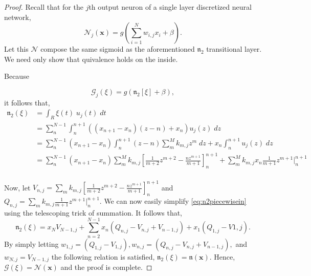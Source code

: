 \begin{proof}
	Recall that for the $j$th output neuron of a single layer discretized neural network,
	\begin{equation}
		\mathcal{N}_j(\pmb{x}) = g\left(\sum^N_{i=1}w_{i,j}x_i + \beta\right).
	\end{equation}
	Let this $\mathcal{N}$ compose the same sigmoid as the aforementioned $\mathfrak{n}_2$ transitional layer. We need only show that quivalence holds on the inside.


	Because 

	\begin{equation}  \label{eq:n2nrelation}
		\mathcal{G}_j(\xi) = g\left(\mathfrak{n}_2[\xi] + \beta\right),
	\end{equation}
	it follows that,
	\begin{equation} \label{eq:n2piecewisein}
	\begin{aligned}
		\mathfrak{n}_2(\xi) &= \int_R\xi(t)\;u_j(t)\;dt \\ 
		 &= \sum_n^{N-1}\int_n^{n+1} \left((x_{n+1} - x_n)(z - n) + x_n\right) u_j(z)\;dz\\ 
		  &= \sum_n^{N-1}(x_{n+1} - x_n) \int_n^{n+1} (z - n) \sum_m^M k_{m,j} z^m\;dz + x_n\int_n^{n+1} u_j(z)\;dz\\
		    &= \sum_n^{N-1}(x_{n+1} - x_n) \sum_m^M k_{m,j} \left[\frac{1}{m+2}z^{m+2} - \frac{nz^{m+1}}{m+1}\right]_n^{n+1}  + \sum_m^M k_{m,j} x_n \frac1{m+1}z^{m+1}\Big|^{n+1}_n
      \end{aligned}
      \end{equation}
      \\
      Now, let $V_{n,j} = \sum_m k_{m,j} \left[\frac{1}{m+2}z^{m+2} - \frac{nz^{m+1}}{m+1}\right]_n^{n+1}$ and $Q_{n,j} = \sum_m k_{m,j} \frac1{m+1}z^{m+1}\big|^{n+1}_n.$ We can now easily simplify \eqref{eq:n2piecewisein} using the telescoping trick of summation. It follows that,
      \begin{equation}
      	\mathfrak{n}_2(\xi) = x_NV_{N-1,j} + \sum_{n=2}^{N-1}x_n\left(Q_{n,j} - V_{n,j} + V_{n-1,j}\right) + x_1\left(Q_{1,j} - V{1,j}\right).
      \end{equation}
      By simply letting $w_{1,j} = \left(Q_{1,j} - V_{1,j}\right), w_{n,j} = \left(Q_{n,j} - V_{n,j} + V_{n-1,j}\right),$ and $w_{N,j} = V_{N-1,j}$
      the following relation is satisfied,
      $\mathfrak{n}_2(\xi) = \mathfrak{n}(\pmb{x}).$
      Hence, $\mathcal{G}(\xi) = \mathcal{N}(\pmb{x})$ and the proof is complete.
\end{proof}

